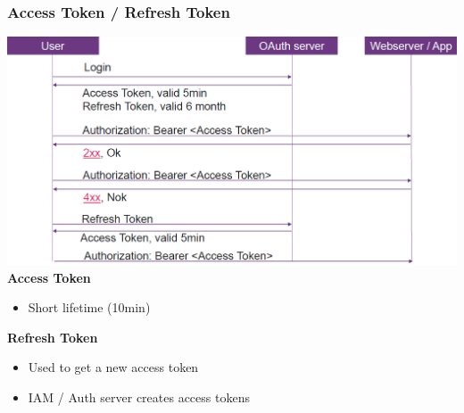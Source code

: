 \subsubsection{Access Token / Refresh Token}
\includegraphics[width=\linewidth]{../img/jwt.png}
\textbf{Access Token}
\begin{itemize}
    \item Short lifetime (10min)
\end{itemize}
\textbf{Refresh Token}
\begin{itemize}
    \item Used to get a new access token
    \item IAM / Auth server creates access tokens
\end{itemize}
